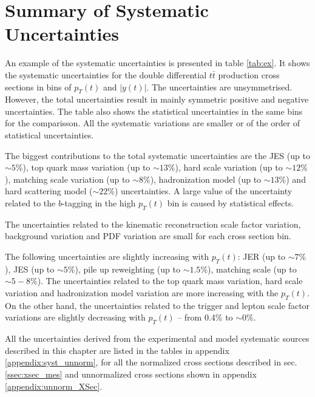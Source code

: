 \section{Summary of Systematic Uncertainties}

An example of the systematic uncertainties is presented in table \ref{tab:ex}. It shows the 
systematic uncertainties for the double differential $t\bar{t}$ production cross sections in bins of $p_{T}(t)$ and $|y(t)|$.
The uncertainties are unsymmetrised. However, the total uncertainties result in mainly symmetric positive and negative uncertainties.
The table also shows the statistical uncertainties in the same bins for the comparisson. All the systematic variations are smaller
or of the order of statistical uncertainties.

The biggest contributions to the total systematic uncertainties are the JES (up to $\sim 5\%$), top quark mass variation (up to
$\sim 13\%$), hard scale variation (up to $\sim 12\%$), matching scale variation (up to $\sim 8\%$), hadronization model
(up to $\sim 13\%$) and hard scattering model ($\sim 22\%$) uncertainties. A large value of the uncertainty related to the $b$-tagging 
in the high $p_{T}(t)$ bin is caused by statistical effects.

The uncertainties related to the kinematic reconstruction scale factor variation, background variation and PDF variation are 
small for each cross section bin.

The following uncertainties are slightly increasing with $p_{T}(t)$: JER (up to $\sim 7\%$), JES (up to $\sim 5\%$), pile up
reweighting (up to $\sim 1.5\%$), matching scale (up to $\sim 5-8\%$). The uncertainties related to the top quark mass variation,
hard scale variation and hadronization model variation are more increasing with the $p_{T}(t)$. On the other hand, the uncertainties
related to the trigger and lepton scale factor variations are slightly decreasing with $p_{T}(t)$ -- from 0.4\% to $\sim0\%$.



All the uncertainties derived from the experimental and model systematic sources described in this chapter are listed in the tables in appendix \ref{appendix:syst_unnorm},
for all the normalized cross sections described in sec. \ref{ssec:xsec_mes} and unnormalized cross sections shown in appendix \ref{appendix:unnorm_XSec}. 
% 
% 

